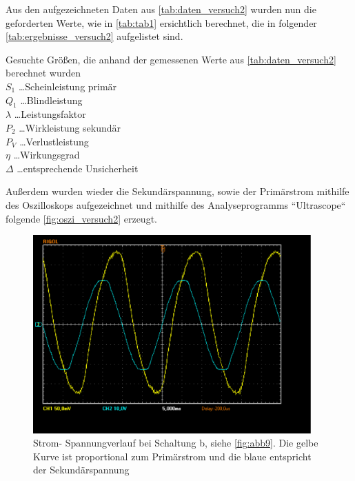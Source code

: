 \documentclass[11pt,ngerman]{scrartcl}
\begin{document}
Aus den aufgezeichneten Daten aus \autoref{tab:daten_versuch2} wurden nun die
geforderten Werte, wie in \autoref{tab:tab1} ersichtlich berechnet, die in folgender \autoref{tab:ergebnisse_versuch2}
aufgelistet sind.


\begin{table}[H]
	\caption{Gesuchte Größen, die anhand der gemessenen Werte aus
		\autoref{tab:daten_versuch2} berechnet wurden \\
		$S_1$ \dots Scheinleistung primär \\
		$Q_1$ \dots  Blindleistung\\
		$\lambda$ \dots Leistungsfaktor\\
		$P_2$ \dots Wirkleistung sekundär \\
		$P_V$ \dots Verlustleistung \\
		$\eta$ \dots Wirkungsgrad \\
		$\Delta$ \dots entsprechende Unsicherheit
	}
	\label{tab:ergebnisse_versuch2}
	\begin{center}
		
	\end{center}
\end{table}

Außerdem wurden wieder die Sekundärspannung, sowie der Primärstrom mithilfe des
Oszilloskops aufgezeichnet und mithilfe des Analyseprogramms ``Ultrascope``
folgende \autoref{fig:oszi_versuch2} erzeugt.

\begin{figure}[H]
	\begin{center}
		\includegraphics[width=0.95\textwidth]{./trafo/widerstand.pdf}
	\end{center}
	\caption{Strom- Spannungverlauf bei Schaltung b, siehe \autoref{fig:abb9}.
		Die gelbe Kurve ist proportional zum Primärstrom und die blaue entspricht der Sekundärspannung}
	\label{fig:oszi_versuch2}
\end{figure}
\end{document}
